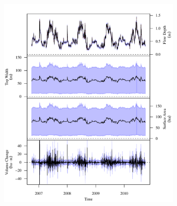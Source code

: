 \begin{linenumbers}
\subfiguretop
\begin{landscape}
	\begin{figure}
		\begin{subfigure}{0.7\textwidth}
			\centering
			\includegraphics[width=\tableCustomSize]{"Figures/Results_USR/Stochastic/G TS A"}
		\end{subfigure}%
		\begin{subfigure}{0.7\textwidth}
			\centering

\end{subfigure}
\end{figure}
\end{landscape}
\end{linenumbers}

